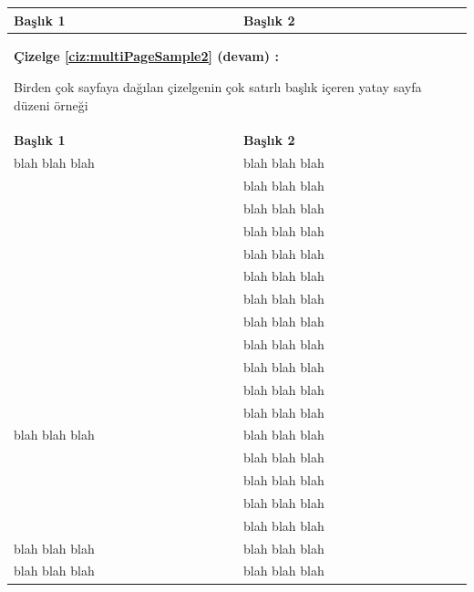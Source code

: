 \documentclass[a4paper,oneside,12pt]{report}
\begin{document}
\begin{landscape} %
\begin{table}[thbp]
	\caption[Birden çok sayfaya dağılan yatay tablo örneği]{Birden çok sayfaya dağılan çizelgenin çok satırlı başlık içeren yatay sayfa düzeni örneği}
	\label{ciz:multiPageSample2}
	\vskip -12pt
\end{table}
\begin{center}
	\addtocounter{table}{-1}
	\begin{longtable}{ll}\hline
		\textbf{Başlık 1}& \textbf{Başlık 2}\\\hline
		\endfirsthead
		\multicolumn{2}{m{1\textwidth}}{%
			\textbf{Çizelge \ref{ciz:multiPageSample2} (devam) :} \hspace{0.5em} 
			\parbox[t]{0.85\textheight}{%
			Birden çok sayfaya dağılan çizelgenin çok satırlı başlık içeren yatay sayfa düzeni örneği
			}
		} \\ \hline
		\textbf{Başlık 1}& \textbf{Başlık 2}\\ \hline
		\endhead
		\endfoot
		\endlastfoot
	
		blah blah blah & blah blah blah \\
		& blah blah blah \\
		& blah blah blah \\
		& blah blah blah \\
		& blah blah blah \\
		& blah blah blah \\
		& blah blah blah \\
		& blah blah blah \\
		& blah blah blah \\
		& blah blah blah \\
		& blah blah blah \\
		& blah blah blah \\
		
		blah blah blah & blah blah blah \\
		& blah blah blah \\
		& blah blah blah \\
		& blah blah blah \\
		& blah blah blah \\
		blah blah blah & blah blah blah \\		
		blah blah blah & blah blah blah \vspace{2pt}  \\\hline 
		

\end{longtable}
\end{center}
\end{landscape}
\end{document}
